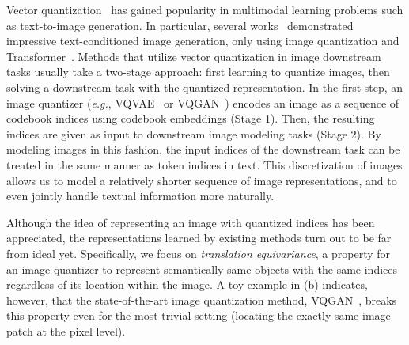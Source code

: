 \documentclass{article}
\begin{document}
Vector quantization~\cite{oord2017neural} has gained popularity in multimodal learning problems such as text-to-image generation. In particular, several works~\cite{ramesh2021zero, ding2021cogview, yu2022scaling} demonstrated impressive text-conditioned image generation, only using image quantization and Transformer~\cite{vaswani2017attention}.
Methods that utilize vector quantization in image downstream tasks usually take a two-stage approach: first learning to quantize images, then solving a downstream task with the quantized representation.
In the first step, an image quantizer (\textit{e.g.}, VQVAE~\cite{oord2017neural} or VQGAN~\cite{esser2021taming}) encodes an image as a sequence of codebook indices using codebook embeddings (Stage 1). Then, the resulting indices are given as input to downstream image modeling tasks (Stage 2). 
By modeling images in this fashion, the input indices of the downstream task can be treated in the same manner as token indices in text. This discretization of images allows us to model a relatively shorter sequence of image representations, and to even jointly handle textual information more naturally.

Although the idea of representing an image with quantized indices has been appreciated, the representations learned by existing methods turn out to be far from ideal yet. Specifically, we focus on \emph{translation equivariance}, a property for an image quantizer to represent semantically same objects with the same indices regardless of its location within the image. A toy example in  (b) indicates, however, that the state-of-the-art image quantization method, VQGAN~\cite{esser2021taming}, breaks this property even for the most trivial setting (locating the exactly same image patch at the pixel level).
\end{document}
